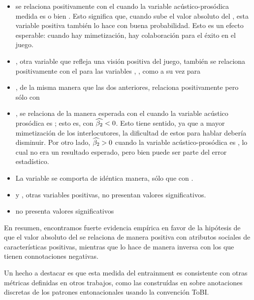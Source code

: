 \begin{itemize}
  \item \svcontributes se relaciona positivamente con el \absentrainment cuando la variable acústico-prosódica medida es \FOMEAN o bien \NOISETOHARMONICS. Esto significa que, cuando sube el valor absoluto del \entrainment, esta variable positiva también lo hace con buena probabilidad. Esto es un efecto esperable: cuando hay mimetización, hay colaboración para el éxito en el juego.
  \item \svclear, otra variable que refleja una visión positiva del juego, también se relaciona positivamente con el \absentrainment para las variables \FOMEAN, \NOISETOHARMONICS, \ENGMAX como a su vez para \PHONAVG
  \item \svengaged, de la misma manera que las dos anteriores, relaciona positivamente pero sólo con \FOMEAN
  \item \svdifficult, se relaciona de la manera esperada con el \absentrainment cuando la variable acústico prosódica es \ENGMAX; esto es, con $\widehat{\beta_2} < 0$. Esto tiene sentido, ya que a mayor mimetización de los interlocutores, la dificultad de estos para hablar debería disminuir. Por otro lado, $\widehat{\beta_2} > 0$ cuando la variable acústico-prosódica es \ENGMEAN, lo cual no era un resultado esperado, pero bien puede ser parte del error estadístico.
  \item La variable \svbored se comporta de idéntica manera, sólo que con \FOMEAN.
  \item \svplanning y \svencourages, otras variables positivas, no presentan valores significativos.
  \item \svdislikes no presenta valores significativos
\end{itemize}

En resumen, encontramos fuerte evidencia empírica en favor de la hipótesis de que el valor absoluto del \entrainment se relaciona de manera positiva con atributos sociales de características positivas, mientras que lo hace de manera inversa con los que tienen connotaciones negativas.

Un hecho a destacar es que esta medida del entrainment es consistente con otras métricas definidas en otros trabajos, como las construídas en \cite{gravano2015backward} sobre anotaciones discretas de los patrones entonacionales usando la convención ToBI\cite{pitrelli1994evaluation}.



